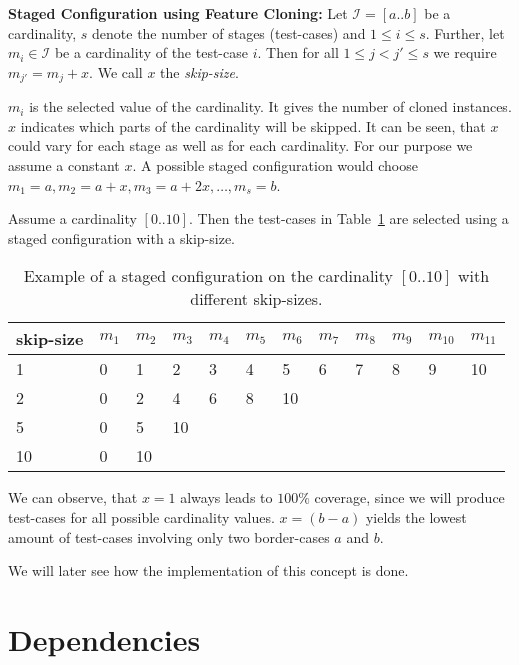 \begin{definition}{\textbf{Staged Configuration using Feature Cloning:}}\label{def:staged}
Let $\mathcal{I} = [a..b]$ be a cardinality, $s$ denote the number of stages (test-cases) and $1 \leq i \leq s$. Further, let $m_{i} \in \mathcal{I}$ be a cardinality of the test-case $i$. Then for all $1 \leq j < j' \leq s$ we require $m_{j'} = m_j + x$. We call $x$ the \emph{skip-size}.
\end{definition}

$m_i$ is the selected value of the cardinality. It gives the number of cloned instances. $x$ indicates which parts of the cardinality will be skipped. It can be seen, that $x$ could vary for each stage as well as for each cardinality. For our purpose we assume a constant $x$. 
A possible staged configuration would choose $m_1 = a, m_2 = a + x, m_3 = a + 2x, \ldots, m_s = b$. 

\begin{example}
Assume a cardinality $[0..10]$. Then the test-cases in Table~\ref{tab:exTc} are selected using a staged configuration with a skip-size. 
\begin{table}[h]
\centering
\begin{tabular}{l|l|l|l|l|l|l|l|l|l|l|l}
\textbf{skip-size} & $m_1$ & $m_2$ & $m_3$ & $m_4$ & $m_5$ & $m_6$ & $m_7$ & $m_8$ & $m_9$ & $m_{10}$ & $m_{11}$\\ \hline
1 & 0 & 1 & 2 & 3 & 4 & 5 & 6 & 7 & 8 & 9 & 10 \\ \hline
2 & 0 & 2 & 4 & 6 & 8 & 10 & & & & & \\ \hline
5 & 0 & 5 & 10 & & & & & & & & \\ \hline
10 & 0 & 10 & & & & & & & & &
\end{tabular}
\caption[Staged Configuration Example]{Example of a staged configuration on the cardinality $[0..10]$ with different skip-sizes.}\label{tab:exTc}
\end{table} 
We can observe, that $x = 1$ always leads to $100 \%$ coverage, since we will produce test-cases for all possible cardinality values. $x = (b-a)$ yields the lowest amount of test-cases involving only two border-cases $a$ and $b$.
\end{example}

We will later see how the implementation of this concept is done.


\section{Dependencies}\label{sec:mconstraints}

